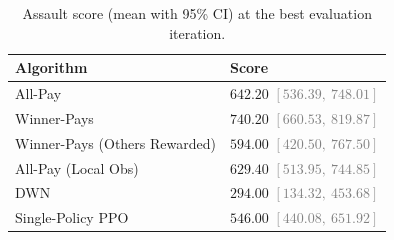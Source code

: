 \begin{table}
  \centering
  \caption{Assault score (mean with 95\% CI) at the best evaluation iteration.}
  \begin{tabular}{ll}
    \hline
    {\bf Algorithm} & {\bf Score} \\
    \hline
    All-Pay & $642.20$ {\small\textcolor{gray}{$[536.39,\ 748.01]$}} \\
    Winner-Pays & $740.20$ {\small\textcolor{gray}{$[660.53,\ 819.87]$}} \\
    Winner-Pays (Others Rewarded) & $594.00$ {\small\textcolor{gray}{$[420.50,\ 767.50]$}} \\
    All-Pay (Local Obs) & $629.40$ {\small\textcolor{gray}{$[513.95,\ 744.85]$}} \\
    DWN & $294.00$ {\small\textcolor{gray}{$[134.32,\ 453.68]$}} \\
    Single-Policy PPO & $546.00$ {\small\textcolor{gray}{$[440.08,\ 651.92]$}} \\
    \hline
  \end{tabular}
  \label{tab:assault_all_methods}
\end{table}
